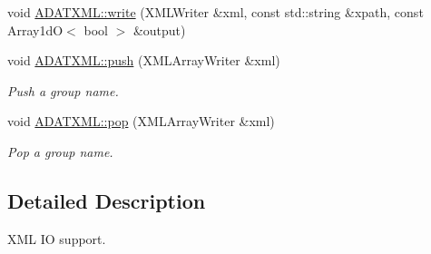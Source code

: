 \begin{DoxyCompactItemize}
\item 
void \mbox{\hyperlink{group__io_ga17afd14eb981c71780dc1b0074758afc}{A\+D\+A\+T\+X\+M\+L\+::write}} (X\+M\+L\+Writer \&xml, const std\+::string \&xpath, const Array1dO$<$ bool $>$ \&output)
\item 
void \mbox{\hyperlink{group__io_ga957f4130fa008139cd16879b0794ae54}{A\+D\+A\+T\+X\+M\+L\+::push}} (X\+M\+L\+Array\+Writer \&xml)
\begin{DoxyCompactList}\small\item\em Push a group name. \end{DoxyCompactList}\item 
void \mbox{\hyperlink{group__io_gafc9d3fe6a9094c09371a9213eb4b6cdd}{A\+D\+A\+T\+X\+M\+L\+::pop}} (X\+M\+L\+Array\+Writer \&xml)
\begin{DoxyCompactList}\small\item\em Pop a group name. \end{DoxyCompactList}\end{DoxyCompactItemize}


\subsection{Detailed Description}
X\+ML IO support. 

